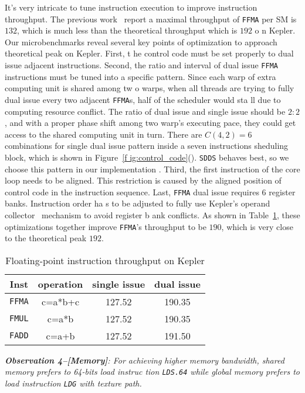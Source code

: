 It's very intricate to tune instruction execution to improve instruction throughput. The previous work~\cite{lai} report
 a maximal throughput of {\tt FFMA} per SM is $132$, which is much less than the theoretical throughput which is $192$ o
n Kepler. Our microbenchmarks reveal several key points of optimization to approach theoretical peak on Kepler. First, t
he control code must be set properly to dual issue adjacent instructions. Second, the ratio and interval of dual issue {
\tt FFMA} instructions must be tuned into a specific pattern. Since each warp of extra computing unit is shared among tw
o warps, when all threads are trying to fully dual issue every two adjacent {\tt FFMA}s, half of the scheduler would sta
ll due to computing resource conflict. The ratio of dual issue and single issue should be $2:2$, and with a proper phase
 shift among two warp's executing pace, they could get access to the shared computing unit in turn. There are $C(4,2)=6$
 combinations for single dual issue pattern inside a seven instructions sheduling block, which is shown in Figure~\ref{f
ig:control_code}(). {\tt SDDS} behaves best, so we choose this pattern in our implementation
. Third, the first instruction of the core loop needs to be aligned. This restriction is caused by the aligned position 
of control code in the instruction sequence. Last, {\tt FFMA} dual issue requires 6 register banks. Instruction order ha
s to be adjusted to fully use Kepler's operand collector~\cite{collector,tarjan2012policy} mechanism to avoid register b
ank conflicts. As shown in Table~\ref{tab:ffma}, these optimizations together improve {\tt FFMA}'s throughput  to be $19
0$, which is very close to the theoretical peak $192$.

\begin{table}[htbp]
\caption{Floating-point instruction throughput on Kepler}
\centering
\scalebox{1.} {
\begin{tabular}{|c||c|c|c|}
\hline
Inst &operation&single issue&dual issue\\
\hline
{\tt FFMA} &c=a*b+c&127.52&190.35 \\
\hline
{\tt FMUL} &c=a*b&127.52&190.35 \\
\hline
{\tt FADD} &c=a+b&127.52&191.50\\
\hline
\end{tabular}
}
\label{tab:ffma}
\end{table}


{\em {\bf Observation 4--[Memory]}: For achieving higher memory bandwidth, shared memory prefers to 64-bits load instruc
tion {\tt LDS.64} while global memory prefers to load instruction {\tt LDG} with texture path.}

